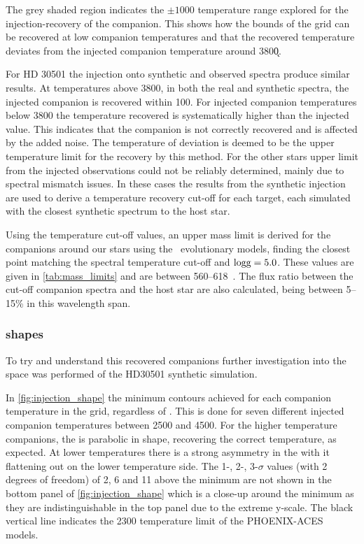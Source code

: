 The grey shaded region indicates the \(\pm 1000\)\K{} temperature range explored for the injection-recovery of the companion.
This shows how the bounds of the grid can be recovered at low companion temperatures and that the recovered temperature deviates from the injected companion temperature around 3800\k{}.

For {HD 30501} the injection onto synthetic and observed spectra produce similar results.
At temperatures above 3800\K{}, in both the real and synthetic spectra, the injected companion is recovered within 100\K{}.
For injected companion temperatures below 3800\K{} the temperature recovered is systematically higher than the injected value.
This indicates that the companion is not correctly recovered and is affected by the added noise.
The temperature of deviation is deemed to be the upper temperature limit for the recovery by this method.
For the other stars upper limit from the injected observations could not be reliably determined, mainly due to spectral mismatch issues.
In these cases the results from the synthetic injection are used to derive a temperature recovery cut-off for each target, each simulated with the closest synthetic spectrum to the host star.

Using the temperature cut-off values, an upper mass limit is derived for the companions around our stars using the~\citet{baraffe_new_2015} evolutionary models, finding the closest point matching the spectral temperature cut-off and \(\textrm{logg}{}=5.0\).
These values are given in \cref{tab:mass_limits} and are between 560--618~\Mjup{}.
The flux ratio between the cut-off companion spectra and the host star are also calculated, being between 5--15\% in this wavelength span.




\subsubsection{\textchisquared{} shapes}
To try and understand this recovered companions further investigation into the \textchisquared{} space was performed of the {HD30501} synthetic simulation.

In \cref{fig:injection_shape} the minimum \textchisquared{} contours achieved for each companion temperature in the grid, regardless of \Rvtwo{}.
This is done for seven different injected companion temperatures between 2500 and 4500\K{}.
For the higher temperature companions, the \textchisquared{} is parabolic in shape, recovering the correct temperature, as expected.
At lower temperatures there is a strong asymmetry in the \textchisquared{} with it flattening out on the lower temperature side.
The 1-, 2-, 3-\(\sigma\) values (with 2 degrees of freedom) of 2, 6 and 11 above the minimum \textchisquared{} are not shown in the bottom panel of \cref{fig:injection_shape} which is a close-up around the minimum \textchisquared{} as they are indistinguishable in the top panel due to the extreme \textchisquared{} y-scale.
The black vertical line indicates the 2300\K{} temperature limit of the {PHOENIX-ACES} models.


